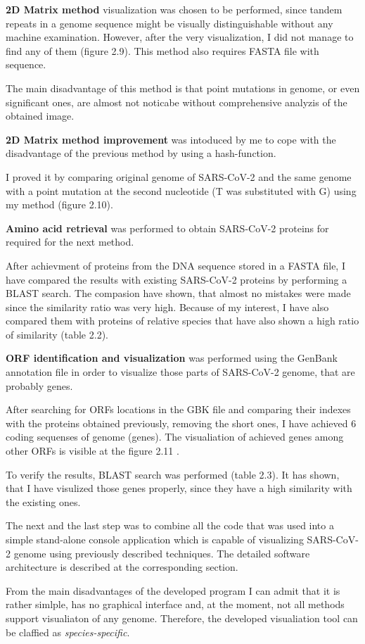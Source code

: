 \textbf{2D Matrix method} visualization was chosen to be performed, since tandem repeats in a genome sequence might be visually distinguishable without any machine examination.
However, after the very visualization, I did not manage to find any of them (figure 2.9).
This method also requires FASTA file with sequence.

The main disadvantage of this method is that point mutations in genome, or even significant ones, are almost not noticabe without comprehensive analyzis of the obtained image.

\textbf{2D Matrix method improvement} was intoduced by me to cope with the disadvantage of the previous method by using a hash-function.

I proved it by comparing original genome of SARS-CoV-2 and the same genome with a point mutation at the second nucleotide (T was substituted with G) using my method (figure 2.10).

\textbf{Amino acid retrieval} was performed to obtain SARS-CoV-2 proteins for required for the next method. 

After achievment of proteins from the DNA sequence stored in a FASTA file, I have compared the results with existing SARS-CoV-2 proteins by performing a BLAST search.
The compasion have shown, that almost no mistakes were made since the similarity ratio was very high.
Because of my interest, I have also compared them with proteins of relative species that have also shown a high ratio of similarity (table 2.2).

\textbf{ORF identification and visualization} was performed using the GenBank annotation file in order to visualize those parts of SARS-CoV-2 genome, that are probably genes.

After searching for ORFs locations in the GBK file and comparing their indexes with the proteins obtained previously, removing the short ones, I have achieved 6 coding sequenses of genome (genes).
The visualiation of achieved genes among other ORFs is visible at the figure 2.11 .

To verify the results, BLAST search was performed (table 2.3).
It has shown, that I have visulized those genes properly, since they have a high similarity with the existing ones.

\smallskip
The next and the last step was to combine all the code that was used into a simple stand-alone console application which is capable of visualizing SARS-CoV-2 genome using previously described techniques.
The detailed software architecture is described at the corresponding section.

From the main disadvantages of the developed program I can admit that it is rather simlple, has no graphical interface and, at the moment, not all methods support visualiaton of any genome.
Therefore, the developed visualiation tool can be claffied as \textit{species-specific}.

\label{evaluation}